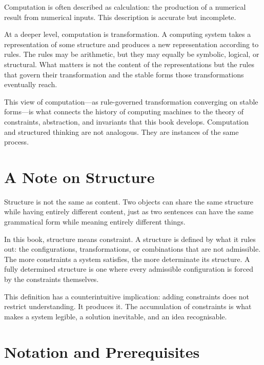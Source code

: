\documentclass[11pt]{book}
\theoremstyle{plain}
\theoremstyle{definition}
\theoremstyle{remark}
\begin{document}
Computation is often described as calculation: the production of a
numerical result from numerical inputs. This description is accurate but
incomplete.

At a deeper level, computation is transformation. A computing system
takes a representation of some structure and produces a new
representation according to rules. The rules may be arithmetic, but
they may equally be symbolic, logical, or structural. What matters is
not the content of the representations but the rules that govern their
transformation and the stable forms those transformations eventually
reach.

This view of computation---as rule-governed transformation converging on
stable forms---is what connects the history of computing machines to the
theory of constraints, abstraction, and invariants that this book
develops. Computation and structured thinking are not analogous. They
are instances of the same process.

\chapter*{A Note on Structure}

Structure is not the same as content. Two objects can share the same
structure while having entirely different content, just as two sentences
can have the same grammatical form while meaning entirely different
things.

In this book, structure means constraint. A structure is defined by what
it rules out: the configurations, transformations, or combinations that
are not admissible. The more constraints a system satisfies, the more
determinate its structure. A fully determined structure is one where
every admissible configuration is forced by the constraints themselves.

This definition has a counterintuitive implication: adding constraints
does not restrict understanding. It produces it. The accumulation of
constraints is what makes a system legible, a solution inevitable, and
an idea recognisable.

\chapter*{Notation and Prerequisites}
\end{document}
